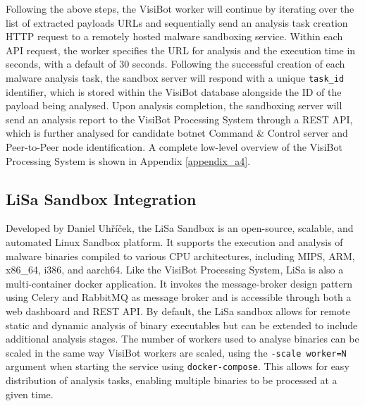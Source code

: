 Following the above steps, the VisiBot worker will continue by iterating over the list of extracted payloads URLs and sequentially send an analysis task creation HTTP request to a remotely hosted malware sandboxing service. Within each API request, the worker specifies the URL for analysis and the execution time in seconds, with a default of 30 seconds. Following the successful creation of each malware analysis task, the sandbox server will respond with a unique \texttt{task\_id} identifier, which is stored within the VisiBot database alongside the ID of the payload being analysed. Upon analysis completion, the sandboxing server will send an analysis report to the VisiBot Processing System through a REST API, which is further analysed for candidate botnet Command \& Control server and Peer-to-Peer node identification. A complete low-level overview of the VisiBot Processing System is shown in Appendix \ref{appendix_a4}.

\subsection{LiSa Sandbox Integration}

Developed by Daniel Uhříček, the LiSa Sandbox \citep{LiSa} is an open-source, scalable, and automated Linux Sandbox platform. It supports the execution and analysis of malware binaries compiled to various CPU architectures, including MIPS, ARM, x86\_64, i386, and aarch64. Like the VisiBot Processing System, LiSa is also a multi-container docker application. It invokes the message-broker design pattern using Celery and RabbitMQ as message broker \citep{Celery, RabbitMQ} and is accessible through both a web dashboard and REST API. By default, the LiSa sandbox allows for remote static and dynamic analysis of binary executables but can be extended to include additional analysis stages. The number of workers used to analyse binaries can be scaled in the same way VisiBot workers are scaled, using the \texttt{-scale worker=N} argument when starting the service using \texttt{docker-compose}. This allows for easy distribution of analysis tasks, enabling multiple binaries to be processed at a given time. 

